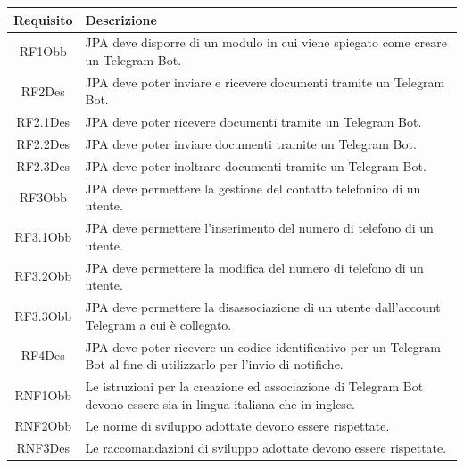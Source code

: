 \begin{tabular}{| c | p{10cm} |}

\hline
\textbf{Requisito} & \textbf{Descrizione} \\
\hline
RF1Obb &
JPA deve disporre di un modulo in cui viene spiegato come creare un Telegram
  Bot. \\
\hline
RF2Des &
JPA deve poter inviare e ricevere documenti tramite un Telegram Bot. \\
\hline
RF2.1Des &
JPA deve poter ricevere documenti tramite un Telegram Bot. \\
\hline
RF2.2Des &
JPA deve poter inviare documenti tramite un Telegram Bot. \\
\hline
RF2.3Des &
JPA deve poter inoltrare documenti tramite un Telegram Bot. \\
\hline
RF3Obb &
JPA deve permettere la gestione del contatto telefonico di un utente. \\
\hline
RF3.1Obb &
JPA deve permettere l'inserimento del numero di telefono di un utente. \\
\hline
RF3.2Obb &
JPA deve permettere la modifica del numero di telefono di un utente. \\
\hline
RF3.3Obb &
JPA deve permettere la disassociazione di un utente dall'account Telegram a
  cui è collegato. \\
\hline
RF4Des &
JPA deve poter ricevere un codice identificativo per un Telegram Bot al fine
  di utilizzarlo per l'invio di notifiche. \\
\hline
RNF1Obb &
Le istruzioni per la creazione ed associazione di Telegram Bot devono essere
  sia in lingua italiana che in inglese.
\\
\hline
RNF2Obb &
Le norme di sviluppo adottate devono essere rispettate.
\\
\hline
RNF3Des &
Le raccomandazioni di sviluppo adottate devono essere rispettate.
\\
\hline
\end{tabular}
\label{tab:requisiti-prototipo}


